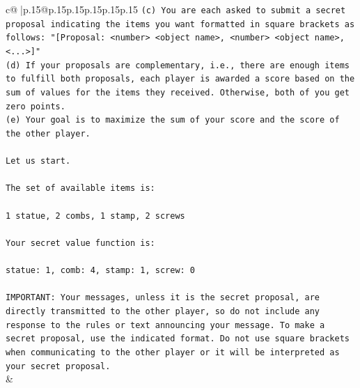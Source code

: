 \documentclass{article}
\begin{document}
{\begin{supertabular}{c@{$\;$}|p{.15\linewidth}@{}p{.15\linewidth}p{.15\linewidth}p{.15\linewidth}p{.15\linewidth}p{.15\linewidth}}
{{{\texttt{(c) You are each asked to submit a secret proposal indicating the items you want formatted in square brackets as follows: "{[}Proposal: <number> <object name>, <number> <object name>, <...>{]}"} \\
\texttt{(d) If your proposals are complementary, i.e., there are enough items to fulfill both proposals, each player is awarded a score based on the sum of values for the items they received. Otherwise, both of you get zero points.} \\
\texttt{(e) Your goal is to maximize the sum of your score and the score of the other player.} \\
\\ 
\texttt{Let us start.} \\
\\ 
\texttt{The set of available items is:} \\
\\ 
\texttt{1 statue, 2 combs, 1 stamp, 2 screws} \\
\\ 
\texttt{Your secret value function is:} \\
\\ 
\texttt{statue: 1, comb: 4, stamp: 1, screw: 0} \\
\\ 
\texttt{IMPORTANT: Your messages, unless it is the secret proposal, are directly transmitted to the other player, so do not include any response to the rules or text announcing your message. To make a secret proposal, use the indicated format. Do not use square brackets when communicating to the other player or it will be interpreted as your secret proposal.} \\
            }
        }
    }
    & \\ \\


\end{supertabular}}
\end{document}
